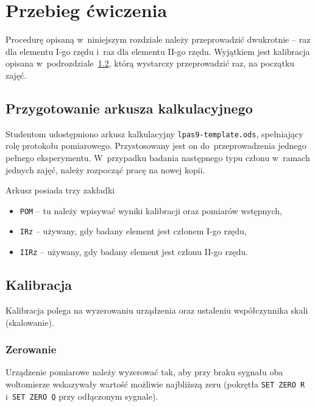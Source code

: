 \documentclass[paper=a4,DIV=12]{lpas}
\begin{document}
\section{Przebieg ćwiczenia}
\label{sec:0DR40}

Procedurę opisaną w~niniejszym rozdziale należy przeprowadzić dwukrotnie -- raz
dla elementu I-go rzędu i~raz dla elementu II-go rzędu. Wyjątkiem jest
kalibracja opisana w~podrozdziale~\ref{sec:VDTSB}, którą wystarczy
przeprowadzić raz, na początku zajęć.

\subsection{Przygotowanie arkusza kalkulacyjnego}
\label{sec:S5JXT}

Studentom udostępniono arkusz kalkulacyjny \texttt{lpas9-template.ods},
spełniający rolę protokołu pomiarowego. Przystosowany jest on
do~przeprowadzenia jednego pełnego eksperymentu. W~przypadku badania następnego
typu członu w~ramach jednych zajęć, należy rozpocząć pracę na nowej kopii.

Arkusz posiada trzy zakładki
\begin{itemize}
  \item \texttt{POM} -- tu należy wpisywać wyniki kalibracji oraz pomiarów
    wstępnych,
  \item \texttt{IRz} -- używany, gdy badany element jest członem I-go rzędu,
  \item \texttt{IIRz} -- używany, gdy badany element jest członu II-go rzędu.
\end{itemize}

\subsection{Kalibracja}
\label{sec:VDTSB}

Kalibracja polega na wyzerowaniu urządzenia oraz ustaleniu współczynnika skali
(skalowanie).

\subsubsection{Zerowanie}
\label{sec:6OYTI}

Urządzenie pomiarowe należy wyzerować tak, aby przy braku sygnału oba
woltomierze wskazywały wartość możliwie najbliższą zeru (pokrętła \texttt{SET
ZERO R} i~\texttt{SET ZERO Q} przy odłączonym sygnale).
\end{document}
